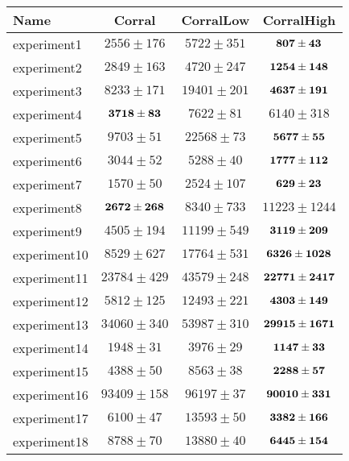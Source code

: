 \begin{tabular}{|l |c|c|c|}
\hline 
Name & Corral & CorralLow & CorralHigh \\
 \hline 
experiment1 & {$2556\pm 176 $}& {$5722\pm 351 $}& {$\bf 807\pm 43 $}\\
experiment2 & {$2849\pm 163 $}& {$4720\pm 247 $}& {$\bf 1254\pm 148 $}\\
experiment3 & {$8233\pm 171 $}& {$19401\pm 201 $}& {$\bf 4637\pm 191 $}\\
experiment4 & {$\bf 3718\pm 83 $}& {$7622\pm 81 $}& {$6140\pm 318 $}\\
experiment5 & {$9703\pm 51 $}& {$22568\pm 73 $}& {$\bf 5677\pm 55 $}\\
experiment6 & {$3044\pm 52 $}& {$5288\pm 40 $}& {$\bf 1777\pm 112 $}\\
experiment7 & {$1570\pm 50 $}& {$2524\pm 107 $}& {$\bf 629\pm 23 $}\\
experiment8 & {$\bf 2672\pm 268 $}& {$8340\pm 733 $}& {$11223\pm 1244 $}\\
experiment9 & {$4505\pm 194 $}& {$11199\pm 549 $}& {$\bf 3119\pm 209 $}\\
experiment10 & {$8529\pm 627 $}& {$17764\pm 531 $}& {$\bf 6326\pm 1028 $}\\
experiment11 & {$23784\pm 429 $}& {$43579\pm 248 $}& {$\bf 22771\pm 2417 $}\\
experiment12 & {$5812\pm 125 $}& {$12493\pm 221 $}& {$\bf 4303\pm 149 $}\\
experiment13 & {$34060\pm 340 $}& {$53987\pm 310 $}& {$\bf 29915\pm 1671 $}\\
experiment14 & {$1948\pm 31 $}& {$3976\pm 29 $}& {$\bf 1147\pm 33 $}\\
experiment15 & {$4388\pm 50 $}& {$8563\pm 38 $}& {$\bf 2288\pm 57 $}\\
experiment16 & {$93409\pm 158 $}& {$96197\pm 37 $}& {$\bf 90010\pm 331 $}\\
experiment17 & {$6100\pm 47 $}& {$13593\pm 50 $}& {$\bf 3382\pm 166 $}\\
experiment18 & {$8788\pm 70 $}& {$13880\pm 40 $}& {$\bf 6445\pm 154 $}\\
\hline 
 \end{tabular}